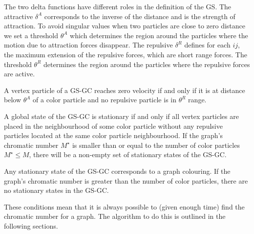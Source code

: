The two delta functions have different roles in the definition of the GS. The attractive $\delta^A$ corresponds to the inverse of the distance and is the strength of attraction. To avoid singular values when two particles are close to zero distance we set a threshold $\theta^A$ which determines the region around the particles where the motion due to attraction forces disappear. The repulsive $\delta^R$ defines for each $ij$, the maximum extension of the repulsive forces, which are short range forces. The threshold $\theta^R$ determines the region around the particles where the repulsive forces are active.

A vertex particle of a GS-GC reaches zero velocity if and only if it is at distance below $\theta^A$ of a color particle and no repulsive particle is in $\theta^R$ range.

A global state of the GS-GC is stationary if and only if all vertex particles are placed in the neighbourhood of some color particle without any repulsive particles located at the same color particle neighbourhood.
If the graph's chromatic number $M^\star$ is smaller than or equal to the number of color particles $M^\star \leq M$, there will be a non-empty set of stationary states of the GS-GC.

Any stationary state of the GS-GC corresponds to a graph colouring.
If the graph's chromatic number is greater than the number of color particles, there are no stationary states in the GS-GC.

These conditions mean that it is always possible to (given enough time) find the chromatic number for a graph. The algorithm to do this is outlined in the following sections.
